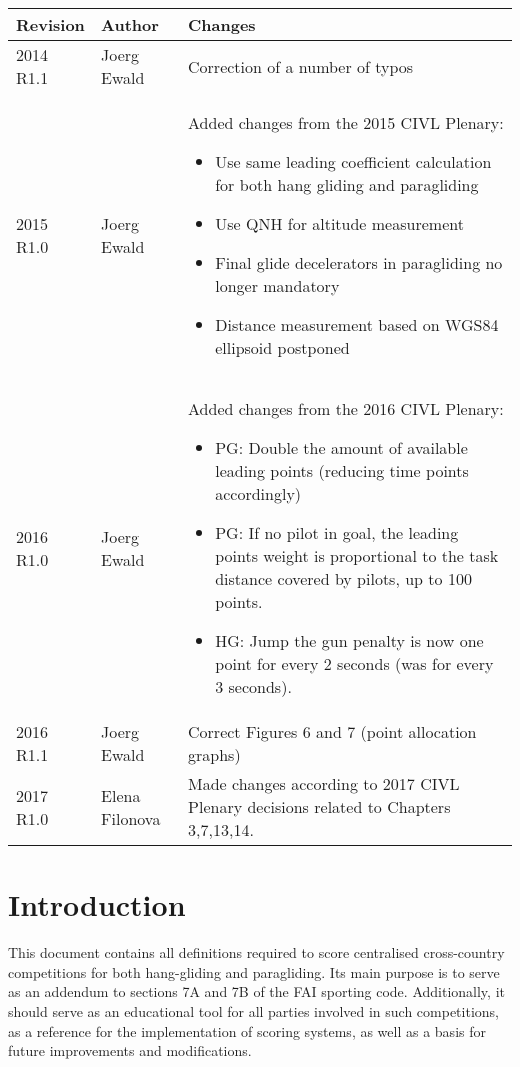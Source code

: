 \documentclass{article}
\begin{document}
\begin{tabularx}{\textwidth}{|l|l|X|}
 \hline
    \textbf{Revision} & \textbf{Author} & \textbf{Changes} \\
 \hline
 2014 R1.1 & Joerg Ewald & Correction of a number of typos \\
 \hline
 2015 R1.0 & Joerg Ewald & Added changes from the 2015 CIVL Plenary:
    \begin{itemize}
        \item Use same leading coefficient calculation for both hang gliding and paragliding
        \item Use QNH for altitude measurement
        \item Final glide decelerators in paragliding no longer mandatory
        \item Distance measurement based on WGS84 ellipsoid postponed
    \end{itemize} \\
 \hline
 2016 R1.0 & Joerg Ewald & Added changes from the 2016 CIVL Plenary:
    \begin{itemize}
        \item PG: Double the amount of available leading points (reducing time points accordingly)
        \item PG: If no pilot in goal, the leading points weight is proportional to the task distance covered by pilots, up to 100 points.
        \item HG: Jump the gun penalty is now one point for every 2 seconds (was for every 3 seconds).
    \end{itemize} \\
 \hline
 2016 R1.1 & Joerg Ewald & Correct Figures 6 and 7 (point allocation graphs) \\
 \hline
 2017 R1.0 & Elena Filonova & Made changes according to 2017 CIVL Plenary decisions related to Chapters 3,7,13,14. \\
\hline
\end{tabularx}

\newpage
\tableofcontents

\newpage
\section{Introduction}
This document contains all definitions required to score centralised
cross-country competitions for both hang-gliding and paragliding. Its main
purpose is to serve as an addendum to sections 7A and 7B of the FAI sporting
code. Additionally, it should serve as an educational tool for all parties
involved in such competitions, as a reference for the implementation of scoring
systems, as well as a basis for future improvements and modifications.
\end{document}
